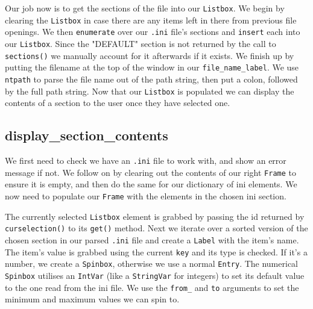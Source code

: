 \documentclass[a4paper,11pt,openany]{book}
\begin{document}
Our job now is to get the sections of the file into our \lstinline[columns=fixed]{Listbox}. We begin by clearing the \lstinline[columns=fixed]{Listbox} in case there are any items left in there from previous file openings. We then \lstinline[columns=fixed]{enumerate} over our \lstinline[columns=fixed]{.ini} file's sections and \lstinline[columns=fixed]{insert} each into our \lstinline[columns=fixed]{Listbox}. Since the "DEFAULT" section is not returned by the call to \lstinline[columns=fixed]{sections()} we manually account for it afterwards if it exists. We finish up by putting the filename at the top of the window in our \lstinline[columns=fixed]{file_name_label}. We use \lstinline[columns=fixed]{ntpath} to parse the file name out of the path string, then put a colon, followed by the full path string. Now that our \lstinline[columns=fixed]{Listbox} is populated we can display the contents of a section to the user once they have selected one.

\subsection{display\_section\_contents}

We first need to check we have an \lstinline[columns=fixed]{.ini} file to work with, and show an error message if not. We follow on by clearing out the contents of our right \lstinline[columns=fixed]{Frame} to ensure it is empty, and then do the same for our dictionary of ini elements. We now need to populate our \lstinline[columns=fixed]{Frame} with the elements in the chosen ini section.

\vspace{5mm}

The currently selected \lstinline[columns=fixed]{Listbox} element is grabbed by passing the id returned by \lstinline[columns=fixed]{curselection()} to its \lstinline[columns=fixed]{get()} method. Next we iterate over a sorted version of the chosen section in our parsed \lstinline[columns=fixed]{.ini} file and create a \lstinline[columns=fixed]{Label} with the item's name. The item's value is grabbed using the current \lstinline[columns=fixed]{key} and its type is checked. If it's a number, we create a \lstinline[columns=fixed]{Spinbox}, otherwise we use a normal \lstinline[columns=fixed]{Entry}. The numerical \lstinline[columns=fixed]{Spinbox} utilises an \lstinline[columns=fixed]{IntVar} (like a \lstinline[columns=fixed]{StringVar} for integers) to set its default value to the one read from the ini file. We use the \lstinline[columns=fixed]{from_} and \lstinline[columns=fixed]{to} arguments to set the minimum and maximum values we can spin to. 
\end{document}

